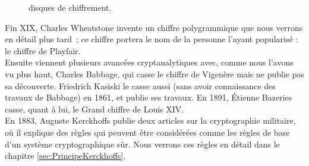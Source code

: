 \begin{figure}[h]
  \begin{center}
    \hspace{1.5cm}
  \end{center}
  \vspace{-10pt}
  \caption{disques de chiffrement.}
  \vspace{-10pt}
  \label{fig:JeffersonDisks}
\end{figure}

Fin XIX\ieme, Charles Wheatstone invente un chiffre
polygrammique que nous verrons en détail plus tard~; ce chiffre
portera le nom de la personne l'ayant popularisé : le chiffre
  de Playfair. \\

Ensuite viennent plusieurs avancées cryptanalytiques avec, comme nous
l'avons vu plus haut, Charles Babbage, qui casse le chiffre de
Vigenère mais ne publie pas sa découverte. Friedrich Kasiski
le casse aussi (sans avoir connaissance des travaux de
Babbage) en 1861, et publie ses travaux. En 1891, Étienne
  Bazeries casse, quant à lui, le Grand chiffre de Louis XIV. 
\\

En 1883, Auguste Kerckhoffs publie deux articles sur la
cryptographie militaire, où il explique des règles qui peuvent être
considérées comme les règles de base d'un système cryptographique
sûr. Nous verrons ces règles en détail dans le chapitre
\ref{sec:PrincipeKerckhoffs}. \\
\clearpage
